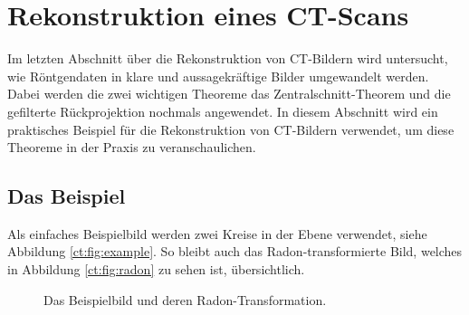 %
%
%
%
\section{Rekonstruktion eines CT-Scans
\label{ct:section:rekonstruktion}}
Im letzten Abschnitt über die Rekonstruktion von CT-Bildern wird untersucht, wie Röntgendaten in klare und aussagekräftige Bilder umgewandelt werden. Dabei werden die zwei wichtigen Theoreme das Zentralschnitt-Theorem und die gefilterte Rückprojektion nochmals angewendet. In diesem Abschnitt wird ein praktisches Beispiel für die Rekonstruktion von CT-Bildern verwendet, um diese Theoreme in der Praxis zu veranschaulichen. 

\subsection{Das Beispiel
\label{ct:subsection:Beispiel}}
Als einfaches Beispielbild werden zwei Kreise in der Ebene verwendet, siehe Abbildung \ref{ct:fig:example}. So bleibt auch das Radon-transformierte Bild, welches in Abbildung \ref{ct:fig:radon} zu sehen ist, übersichtlich.

\begin{figure}
	\centering
	\caption{Das Beispielbild und deren Radon-Transformation.}
\end{figure}


